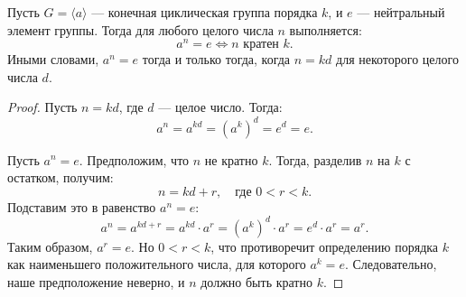 \begin{center}
\end{center}

\begin{shth}
    \begin{theorem}
    \leavevmode \nl 
    
        Пусть \( G = \langle a \rangle \) — конечная циклическая группа порядка \( k \), и \( e \) — нейтральный элемент группы. Тогда для любого целого числа \( n \) выполняется:
        \[
        a^n = e \iff n \text{ кратен } k.
        \]
        Иными словами, \( a^n = e \) тогда и только тогда, когда \( n = kd \) для некоторого целого числа \( d \).
    \end{theorem}
\end{shth}

\begin{proof}
\leavevmode \nl

\boxed{\Longleftarrow} \quad Пусть \( n = kd \), где \( d \) — целое число. Тогда:
\[
a^n = a^{kd} = (a^k)^d = e^d = e.
\]

\boxed{\Longrightarrow} \quad Пусть \( a^n = e \). Предположим, что \( n \) не кратно \( k \). Тогда, разделив \( n \) на \( k \) с остатком, получим:
\[
n = kd + r, \quad \text{где } 0 < r < k.
\]
Подставим это в равенство \( a^n = e \):
\[
a^n = a^{kd + r} = a^{kd} \cdot a^r = (a^k)^d \cdot a^r = e^d \cdot a^r = a^r.
\]
Таким образом, \( a^r = e \). Но \( 0 < r < k \), что противоречит определению порядка \( k \) как наименьшего положительного числа, для которого \( a^k = e \). Следовательно, наше предположение неверно, и \( n \) должно быть кратно \( k \).
\end{proof}
\vspace{0.3cm}

